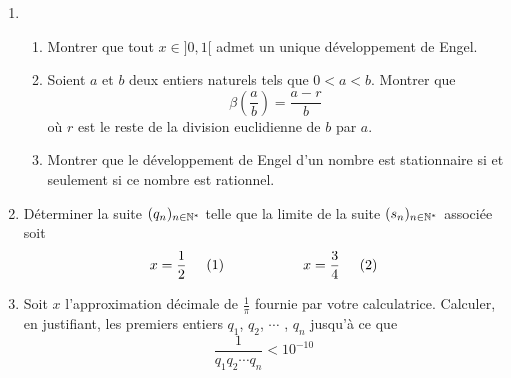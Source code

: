 \begin{enumerate}
\begin{enumerate}
\end{enumerate}
\item
\begin{enumerate}
 \item Montrer que tout $x\in]0,1[$ admet un unique développement de Engel.
\item Soient $a$ et $b$ deux entiers naturels tels que $0<a<b$. Montrer que
\begin{displaymath}
 \beta(\frac{a}{b}) = \frac{a-r}{b}
\end{displaymath}
où $r$ est le reste de la division euclidienne de $b$ par $a$.
\item Montrer que le développement de Engel d'un nombre est stationnaire si et seulement si ce nombre est rationnel.
\end{enumerate}

\item D{\'e}terminer la suite $(q_{n})_{n\in \mathbb{N}^{*}}$ telle que la limite de la suite $(s_{n})_{n\in \mathbb{N}^{*}}$ associ{\'e}e soit
\begin{displaymath}
x = \frac{1}{2} \hspace{0.5cm}(1) \hspace{2cm}
x = \frac{3}{4} \hspace{0.5cm}(2)
\end{displaymath}
\item Soit $x$ l'approximation d{\'e}cimale de $\frac{1}{\pi }$ fournie par votre calculatrice. Calculer, en justifiant, les premiers entiers $q_{1}$, $q_{2}$, $\cdots $ , $q_{n}$ jusqu'{\`a} ce que
\[
\frac{1}{q_{1}q_{2}\cdots q_{n}}<10^{-10}
\]
\end{enumerate}
